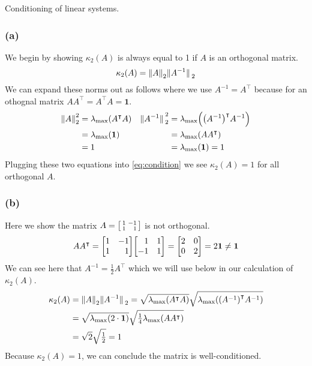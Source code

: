 \documentclass[boxes,pages]{homework}
\newcommand{\tpose}[1]{#1^\intercal}
\newcommand{\inv}[1]{#1^{-1}}
\begin{document}

\begin{problem}
Conditioning of linear systems.
\end{problem}

\begin{solution}
	\subsubsection*{(a)}
	We begin by showing $\kappa_2(A)$ is always equal to 1 if $A$ is an orthogonal matrix.
	\begin{equation}\label{eq:condition}
		\kappa_2(A) = \norm{A}_2\norm*{\inv{A}}_2
	\end{equation}
	We can expand these norms out as follows where we use $\inv{A} = \tpose{A}$ because for an othognal matrix $A\tpose{A} = \tpose{A}A = \mathbf{1}$.
	\begin{align*}
		\norm{A}_2^2 & = \lambda_\text{max}\qty(\tpose{A}A) & \norm*{\inv{A}}_2^2 & = \lambda_\text{max}\qty(\tpose{\qty(\inv{A})}\inv{A}) \\
		             & = \lambda_\text{max}\qty(\mathbf{1}) &                     & = \lambda_\text{max}\qty(A\tpose{A})                   \\
		             & = 1                                  &                     & = \lambda_\text{max}\qty(\mathbf{1}) = 1
	\end{align*}
	Plugging these two equations into \cref{eq:condition} we see $\kappa_2(A) = 1$ for all orthogonal $A$.

	\subsubsection*{(b)}
	Here we show the matrix $A = \smqty[1 & -1 \\ 1 & \phantom{-}1]$ is not orthogonal.
	\begin{equation*}
		A\tpose{A} = \mqty[1 & -1 \\ 1 & \phantom{-}1]\mqty[\phantom{-}1 & 1 \\ -1 & 1] = \mqty[2 & 0 \\ 0 & 2] = 2\mathbf{1} \neq \mathbf{1}
	\end{equation*}
	We can see here that $\inv{A} = \frac{1}{2}\tpose{A}$ which we will use below in our calculation of $\kappa_2(A)$.
	\begin{align*}
		\kappa_2(A) & = \norm{A}_2\norm*{\inv{A}}_2 = \sqrt{\lambda_\text{max}\qty(\tpose{A}A)}\sqrt{\lambda_\text{max}\qty(\tpose{\qty(\inv{A})}\inv{A})} \\
		            & = \sqrt{\lambda_\text{max}\qty(2\cdot\mathbf{1})}\sqrt{\tfrac{1}{4}\lambda_\text{max}\qty(A\tpose{A})}                               \\
		            & = \sqrt{2}\sqrt{\tfrac{1}{2}} = 1
	\end{align*}
	Because $\kappa_2(A) = 1$, we can conclude the matrix is well-conditioned.


\end{solution}
\end{document}
